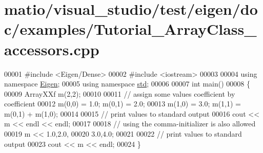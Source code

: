 \hypertarget{matio_2visual__studio_2test_2eigen_2doc_2examples_2_tutorial___array_class__accessors_8cpp_source}{}\section{matio/visual\+\_\+studio/test/eigen/doc/examples/\+Tutorial\+\_\+\+Array\+Class\+\_\+accessors.cpp}
\label{matio_2visual__studio_2test_2eigen_2doc_2examples_2_tutorial___array_class__accessors_8cpp_source}

\begin{DoxyCode}
00001 \textcolor{preprocessor}{#include <Eigen/Dense>}
00002 \textcolor{preprocessor}{#include <iostream>}
00003 
00004 \textcolor{keyword}{using namespace }\hyperlink{namespace_eigen}{Eigen};
00005 \textcolor{keyword}{using namespace }\hyperlink{namespacestd}{std};
00006 
00007 \textcolor{keywordtype}{int} main()
00008 \{
00009   ArrayXXf  m(2,2);
00010   
00011   \textcolor{comment}{// assign some values coefficient by coefficient}
00012   m(0,0) = 1.0; m(0,1) = 2.0;
00013   m(1,0) = 3.0; m(1,1) = m(0,1) + m(1,0);
00014   
00015   \textcolor{comment}{// print values to standard output}
00016   cout << m << endl << endl;
00017  
00018   \textcolor{comment}{// using the comma-initializer is also allowed}
00019   m << 1.0,2.0,
00020        3.0,4.0;
00021      
00022   \textcolor{comment}{// print values to standard output}
00023   cout << m << endl;
00024 \}
\end{DoxyCode}
